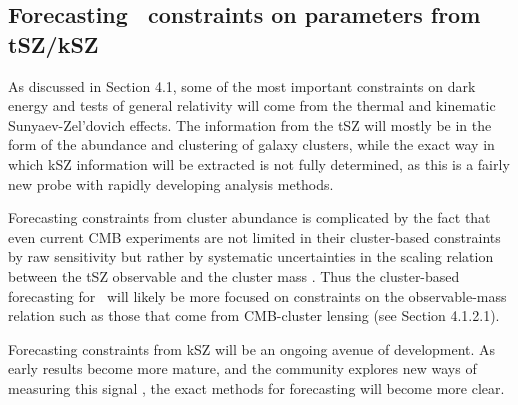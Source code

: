\subsection{Forecasting \cmbexp\ constraints on parameters from tSZ/kSZ}

As discussed in Section 4.1, some of the most important constraints on dark energy and tests of 
general relativity will come from the thermal and kinematic Sunyaev-Zel'dovich effects. The information
from the tSZ will mostly be in the form of the abundance and clustering of galaxy clusters, while the 
exact way in which kSZ information will be extracted is not fully determined, as this is a fairly new probe
with rapidly developing analysis methods.

Forecasting constraints from cluster abundance is complicated by the fact that even current CMB 
experiments are not limited in their cluster-based constraints by raw sensitivity but rather by systematic
uncertainties in the scaling relation between the tSZ observable and the cluster mass 
\cite{Reichardt:2012yj,Ade:2015fva}. Thus the cluster-based forecasting for \cmbexp\ will likely be more
focused on constraints on the observable-mass relation such as those that come from CMB-cluster
lensing (see Section 4.1.2.1).

Forecasting constraints from kSZ will be an ongoing avenue of development. As early results become
more mature, and the community explores new ways of measuring this signal 
\cite{Hand:2012ui,Keisler:2012eg,Ade:2015lza,Schaan:2015uaa,Hill:2016dta,Soergel:2016mce}, the exact methods for forecasting
will become more clear.
